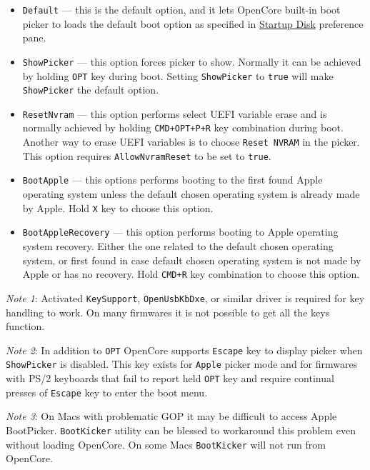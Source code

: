 \documentclass[]{article}
\providecommand{\tightlist}{%
  \setlength{\itemsep}{0pt}\setlength{\parskip}{0pt}}
\begin{document}
\begin{enumerate}
  \begin{itemize}
  \tightlist
  \item \texttt{Default} --- this is the default option, and it lets OpenCore built-in
  boot picker to loads the default boot option as specified in
  \href{https://support.apple.com/HT202796}{Startup Disk} preference pane.
  \item \texttt{ShowPicker} --- this option forces picker to show. Normally it can be
  achieved by holding \texttt{OPT} key during boot. Setting \texttt{ShowPicker} to
  \texttt{true} will make \texttt{ShowPicker} the default option.
  \item \texttt{ResetNvram} --- this option performs select UEFI variable erase and is
  normally achieved by holding \texttt{CMD+OPT+P+R} key combination during boot.
  Another way to erase UEFI variables is to choose \texttt{Reset NVRAM} in the picker.
  This option requires \texttt{AllowNvramReset} to be set to \texttt{true}.
  \item \texttt{BootApple} --- this options performs booting to the first found Apple
  operating system unless the default chosen operating system is already made by Apple.
  Hold \texttt{X} key to choose this option.
  \item \texttt{BootAppleRecovery} --- this option performs booting to Apple operating
  system recovery. Either the one related to the default chosen operating system,
  or first found in case default chosen operating system is not made by Apple or has no
  recovery. Hold \texttt{CMD+R} key combination to choose this option.
  \end{itemize}

  \emph{Note 1}: Activated \texttt{KeySupport}, \texttt{OpenUsbKbDxe}, or similar driver is required
  for key handling to work. On many firmwares it is not possible to get all the keys function.

  \emph{Note 2}: In addition to \texttt{OPT} OpenCore supports \texttt{Escape} key to display picker when
  \texttt{ShowPicker} is disabled. This key exists for \texttt{Apple} picker mode and for
  firmwares with PS/2 keyboards that fail to report held \texttt{OPT} key and require continual
  presses of \texttt{Escape} key to enter the boot menu.

  \emph{Note 3}: On Macs with problematic GOP it may be difficult to access Apple BootPicker.
  \texttt{BootKicker} utility can be blessed to workaround this problem even without loading
  OpenCore. On some Macs \texttt{BootKicker} will not run from OpenCore.

\end{enumerate}
\end{document}
